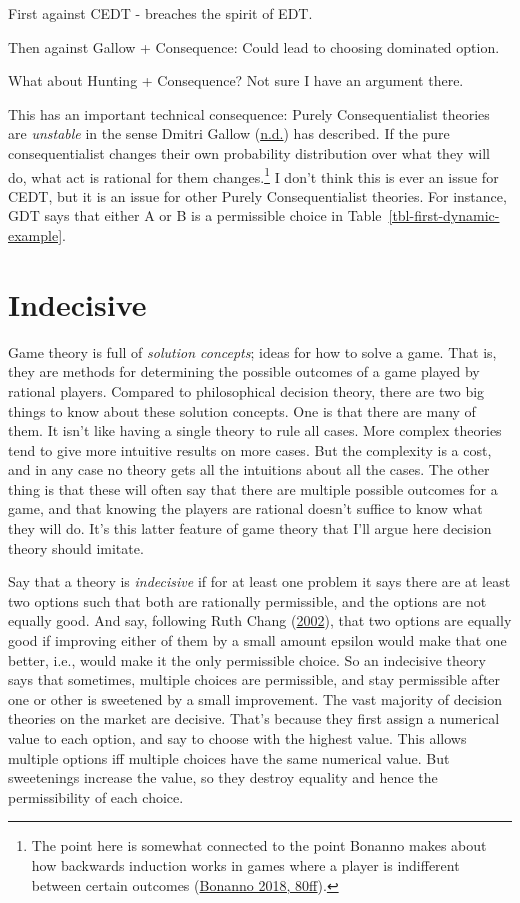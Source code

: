 \documentclass[
  12pt,
  letterpaper,
  DIV=11,
  numbers=noendperiod]{scrreprt}
\begin{document}
First against CEDT - breaches the spirit of EDT.

Then against Gallow + Consequence: Could lead to choosing dominated
option.

What about Hunting + Consequence? Not sure I have an argument there.

This has an important technical consequence: Purely Consequentialist
theories are \emph{unstable} in the sense Dmitri Gallow
(\protect\hyperlink{ref-Gallownd}{n.d.}) has described. If the pure
consequentialist changes their own probability distribution over what
they will do, what act is rational for them changes.\footnote{The point
  here is somewhat connected to the point Bonanno makes about how
  backwards induction works in games where a player is indifferent
  between certain outcomes (\protect\hyperlink{ref-Bonanno2018}{Bonanno
  2018, 80ff}).} I don't think this is ever an issue for CEDT, but it is
an issue for other Purely Consequentialist theories. For instance, GDT
says that either A or B is a permissible choice in
Table~\ref{tbl-first-dynamic-example}.


\hypertarget{sec-indecisive}{%
\chapter{Indecisive}\label{sec-indecisive}}

Game theory is full of \emph{solution concepts}; ideas for how to solve
a game. That is, they are methods for determining the possible outcomes
of a game played by rational players. Compared to philosophical decision
theory, there are two big things to know about these solution concepts.
One is that there are many of them. It isn't like having a single theory
to rule all cases. More complex theories tend to give more intuitive
results on more cases. But the complexity is a cost, and in any case no
theory gets all the intuitions about all the cases. The other thing is
that these will often say that there are multiple possible outcomes for
a game, and that knowing the players are rational doesn't suffice to
know what they will do. It's this latter feature of game theory that
I'll argue here decision theory should imitate.

Say that a theory is \emph{indecisive} if for at least one problem it
says there are at least two options such that both are rationally
permissible, and the options are not equally good. And say, following
Ruth Chang (\protect\hyperlink{ref-Chang2002}{2002}), that two options
are equally good if improving either of them by a small amount epsilon
would make that one better, i.e., would make it the only permissible
choice. So an indecisive theory says that sometimes, multiple choices
are permissible, and stay permissible after one or other is sweetened by
a small improvement. The vast majority of decision theories on the
market are decisive. That's because they first assign a numerical value
to each option, and say to choose with the highest value. This allows
multiple options iff multiple choices have the same numerical value. But
sweetenings increase the value, so they destroy equality and hence the
permissibility of each choice.
\end{document}
